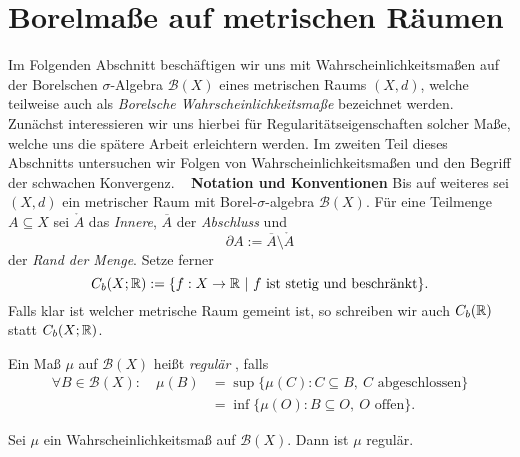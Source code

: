 \section{Borelmaße auf metrischen Räumen}
Im Folgenden Abschnitt beschäftigen wir uns mit Wahrscheinlichkeitsmaßen auf der Borelschen $\sigma$-Algebra $\mathcal{B}(X)$ eines metrischen Raums $(X,d)$, 
welche teilweise auch als \textit{Borelsche Wahrscheinlichkeitsmaße} bezeichnet werden. 
Zunächst interessieren wir uns hierbei für Regularitätseigenschaften solcher Maße, welche uns die spätere Arbeit erleichtern werden. 
Im zweiten Teil dieses Abschnitts untersuchen wir Folgen von Wahrscheinlichkeitsmaßen und den Begriff der schwachen Konvergenz. 
\newline \ \newline 
\textbf{Notation und Konventionen} 
\newline
Bis auf weiteres sei $(X,d)$ ein metrischer Raum mit Borel-$\sigma$-algebra $\mathcal{B}(X)$. 
Für eine Teilmenge $A \subseteq X$ sei $\mathring{A}$ das \textit{Innere}, $\overline{A}$ der \textit{Abschluss} und 
$$
    \partial A := \overline{A} \setminus \mathring{A}
$$
der \textit{Rand der Menge}. 
Setze ferner 
$$
    C_b(X;\mathbb{R}) := \{f:X \to \mathbb{R} \ | \ f \text{ ist stetig und beschränkt} \}.
$$ 
Falls klar ist welcher metrische Raum gemeint ist, so schreiben wir auch $C_b(\mathbb{R})$ statt $C_b(X;\mathbb{R})$. 
\newline 



\begin{mydef}
    Ein Maß $\mu$ auf $\mathcal{B}(X)$ heißt \textit{regulär} , falls
    \begin{align*}
        \forall B \in \mathcal{B}(X): \quad \mu(B) &= \sup\{\mu(C): C \subseteq B, \ C \text{ abgeschlossen} \} \\\
                                                   &= \inf\{\mu(O): B \subseteq O, \ O \text{ offen} \}.  
    \end{align*}  
\end{mydef}

\begin{proposition}
    Sei $\mu$ ein Wahrscheinlichkeitsmaß auf $\mathcal{B}(X)$. Dann ist $\mu$ regulär. 
\end{proposition}

